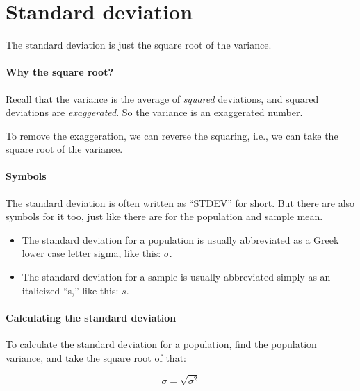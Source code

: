 \documentclass[../../../main.tex]{subfiles}
\begin{document}
\section{Standard deviation}

The standard deviation is just the square root of the variance. 


\paragraph{Why the square root?}

Recall that the variance is the average of \emph{squared} deviations, and squared deviations are \emph{exaggerated}. So the variance is an exaggerated number.

To remove the exaggeration, we can reverse the squaring, i.e., we can take the square root of the variance.


\paragraph{Symbols}

The standard deviation is often written as ``STDEV'' for short. But there are also symbols for it too, just like there are for the population and sample mean.

\begin{itemize}

  \item The standard deviation for a population is usually abbreviated as a Greek lower case letter sigma, like this: $\sigma$.
  
  \item The standard deviation for a sample is usually abbreviated simply as an italicized ``s,'' like this: $s$. 
  
\end{itemize}


\paragraph{Calculating the standard deviation}

To calculate the standard deviation for a population, find the population variance, and take the square root of that:

\begin{equation*}
  \sigma = \sqrt{\sigma^{2}}
\end{equation*}
\end{document}

